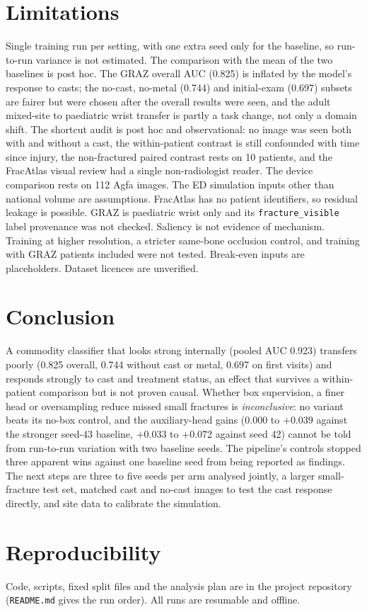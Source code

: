 \documentclass[11pt]{article}
\begin{document}
\section{Limitations}
Single training run per setting, with one extra seed only for the baseline, so run-to-run variance is not estimated. The comparison with the mean of the two baselines is post hoc. The GRAZ overall AUC (0.825) is inflated by the model's response to casts; the no-cast, no-metal (0.744) and initial-exam (0.697) subsets are fairer but were chosen after the overall results were seen, and the adult mixed-site to paediatric wrist transfer is partly a task change, not only a domain shift. The shortcut audit is post hoc and observational: no image was seen both with and without a cast, the within-patient contrast is still confounded with time since injury, the non-fractured paired contrast rests on 10 patients, and the FracAtlas visual review had a single non-radiologist reader. The device comparison rests on 112 Agfa images. The ED simulation inputs other than national volume are assumptions. FracAtlas has no patient identifiers, so residual leakage is possible. GRAZ is paediatric wrist only and its \texttt{fracture\_visible} label provenance was not checked. Saliency is not evidence of mechanism. Training at higher resolution, a stricter same-bone occlusion control, and training with GRAZ patients included were not tested. Break-even inputs are placeholders. Dataset licences are unverified.

\section{Conclusion}
A commodity classifier that looks strong internally (pooled AUC 0.923) transfers poorly (0.825 overall, 0.744 without cast or metal, 0.697 on first visits) and responds strongly to cast and treatment status, an effect that survives a within-patient comparison but is not proven causal. Whether box supervision, a finer head or oversampling reduce missed small fractures is \emph{inconclusive}: no variant beats its no-box control, and the auxiliary-head gains ($0.000$ to $+0.039$ against the stronger seed-43 baseline, $+0.033$ to $+0.072$ against seed 42) cannot be told from run-to-run variation with two baseline seeds. The pipeline's controls stopped three apparent wins against one baseline seed from being reported as findings. The next steps are three to five seeds per arm analysed jointly, a larger small-fracture test set, matched cast and no-cast images to test the cast response directly, and site data to calibrate the simulation.

\section*{Reproducibility}
Code, scripts, fixed split files and the analysis plan are in the project repository (\texttt{README.md} gives the run order). All runs are resumable and offline.



\end{document}
